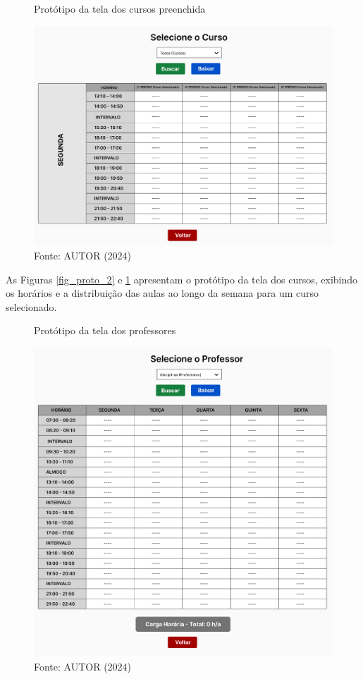 \begin{figure}[htb]
    \centering
    \caption{Protótipo da tela dos cursos preenchida}
    \includegraphics[width=1\textwidth]{Figuras/proto-3.PNG}
    \caption*{Fonte: AUTOR (2024)}
    \label{fig_proto_3}
\end{figure}

As Figuras \ref{fig_proto_2} e \ref{fig_proto_3} apresentam o protótipo da tela dos cursos, exibindo os horários e a distribuição das aulas ao longo da semana para um curso selecionado.

\begin{figure}[htb]
    \centering
    \caption{Protótipo da tela dos professores}
    \includegraphics[width=1\textwidth]{Figuras/proto-4.PNG}
    \caption*{Fonte: AUTOR (2024)}
    \label{fig_proto_4}
\end{figure}

